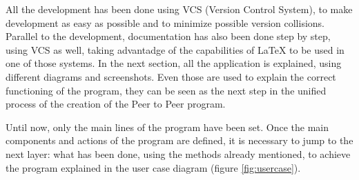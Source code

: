 All the development has been done using VCS (Version Control System), to make development as easy as possible and to minimize possible version collisions. Parallel to the development, documentation has also been done step by step, using VCS as well, taking advantadge of the capabilities of \LaTeX{} to be used in one of those systems. In the next section, all the application is explained, using different diagrams and screenshots. Even those are used to explain the correct functioning of the program, they can be seen as the next step in the unified process of the creation of the Peer to Peer program.

Until now, only the main lines of the program have been set. Once the main components and actions of the program are defined, it is necessary to jump to the next layer: what has been done, using the methods already mentioned, to achieve the program explained in the user case diagram (figure \ref{fig:usercase}). 